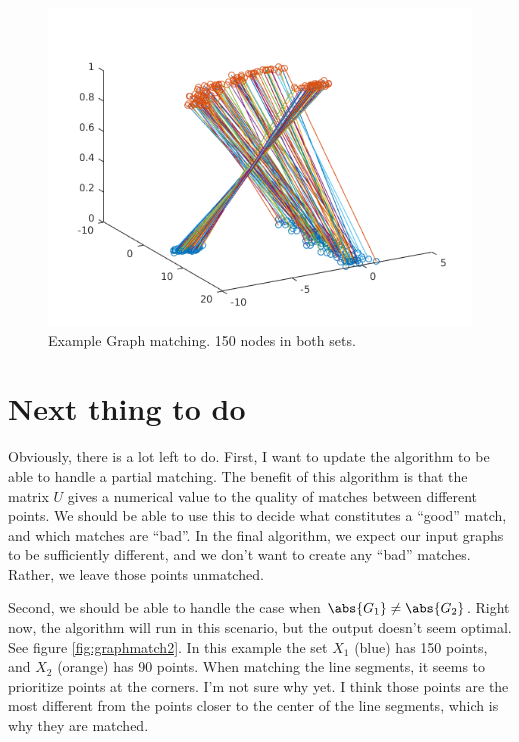 \documentclass[12pt]{article}
\begin{document}
\begin{figure}
  \centering
  \includegraphics[width=15cm]{graphmatch.png}
  \caption{Example Graph matching. 150 nodes in both sets.}
  \label{fig:graphmatch}
\end{figure}

\section*{Next thing to do}

Obviously, there is a lot left to do. First, I want to update the algorithm to be able to handle a partial matching. The benefit of this algorithm is that the matrix $U$ gives a numerical value to the quality of matches between different points. We should be able to use this to decide what constitutes a ``good'' match, and which matches are ``bad''. In the final algorithm, we expect our input graphs to be sufficiently different, and we don't want to create any ``bad'' matches. Rather, we leave those points unmatched.

Second, we should be able to handle the case when $\abs{G_1}\neq\abs{G_2}$. Right now, the algorithm will run in this scenario, but the output doesn't seem optimal. See figure \ref{fig:graphmatch2}. In this example the set $X_1$ (blue) has 150 points, and $X_2$ (orange) has 90 points. When matching the line segments, it seems to prioritize points at the corners. I'm not sure why yet. I think those points are the most different from the points closer to the center of the line segments, which is why they are matched.
\end{document}

